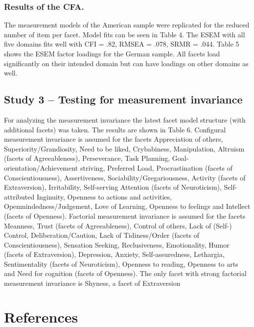 \documentclass[man]{apa6}
\theoremstyle{definition}
\theoremstyle{definition}
\theoremstyle{definition}
\theoremstyle{remark}
\begin{document}
\hypertarget{results-of-the-cfa.}{%
\subsubsection{Results of the CFA.}\label{results-of-the-cfa.}}

The measurement models of the American sample were replicated for the
reduced number of item per facet. Model fits can be seen in Table 4. The
ESEM with all five domains fits well with CFI = .82, RMSEA = .078, SRMR
= .044. Table 5 shows the ESEM factor loadings for the German sample.
All facets load significantly on their intended domain but can have
loadings on other domains as well.

\hypertarget{study-3-testing-for-measurement-invariance}{%
\subsection{Study 3 -- Testing for measurement
invariance}\label{study-3-testing-for-measurement-invariance}}

For analyzing the measurement invariance the latest facet model
structure (with additional facets) was taken. The results are shown in
Table 6. Configural measurement invariance is assumed for the facets
Appreciation of others, Superiority/Grandiosity, Need to be liked,
Crybabiness, Manipulation, Altruism (facets of Agreeableness),
Perseverance, Task Planning, Goal-orientation/Achievement striving,
Preferred Load, Procrastination (facets of Conscientiousness),
Assertiveness, Sociability/Gregariousness, Activity (facets of
Extraversion), Irritability, Self-serving Attention (facets of
Neuroticism), Self-attributed Inginuity, Openness to actions and
activities, Openmindedness/Judgement, Love of Learning, Openness to
feelings and Intellect (facets of Openness). Factorial measurement
invariance is assumed for the facets Meanness, Trust (facets of
Agreeableness), Control of others, Lack of (Self-) Control,
Deliberation/Caution, Lack of Tidiness/Order (facets of
Conscientiousness), Sensation Seeking, Reclusiveness, Emotionality,
Humor (facets of Extraversion), Depression, Anxiety, Self-assuredness,
Lethargia, Sentimentality (facets of Neuroticism), Openness to reading,
Openness to arts and Need for cognition (facets of Openness). The only
facet with strong factorial measurement invariance is Shyness, a facet
of Extraversion

\newpage

\hypertarget{references}{%
\section{References}\label{references}}
\end{document}

